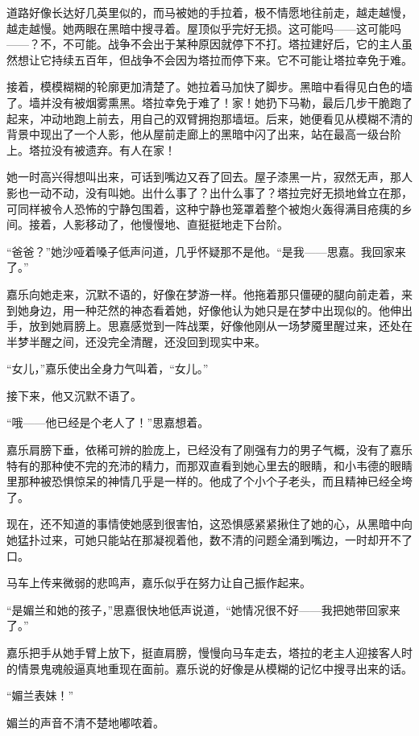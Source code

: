\par 道路好像长达好几英里似的，而马被她的手拉着，极不情愿地往前走，越走越慢，越走越慢。她两眼在黑暗中搜寻着。屋顶似乎完好无损。这可能吗——这可能吗——？不，不可能。战争不会出于某种原因就停下不打。塔拉建好后，它的主人虽然想让它持续五百年，但战争不会因为塔拉而停下来。它不可能让塔拉幸免于难。
\par 接着，模模糊糊的轮廓更加清楚了。她拉着马加快了脚步。黑暗中看得见白色的墙了。墙并没有被烟雾熏黑。塔拉幸免于难了！家！她扔下马勒，最后几步干脆跑了起来，冲动地跑上前去，用自己的双臂拥抱那墙垣。后来，她便看见从模糊不清的背景中现出了一个人影，他从屋前走廊上的黑暗中闪了出来，站在最高一级台阶上。塔拉没有被遗弃。有人在家！
\par 她一时高兴得想叫出来，可话到嘴边又吞了回去。屋子漆黑一片，寂然无声，那人影也一动不动，没有叫她。出什么事了？出什么事了？塔拉完好无损地耸立在那，可同样被令人恐怖的宁静包围着，这种宁静也笼罩着整个被炮火轰得满目疮痍的乡间。接着，人影移动了，他慢慢地、直挺挺地走下台阶。
\par “爸爸？”她沙哑着嗓子低声问道，几乎怀疑那不是他。“是我——思嘉。我回家来了。”
\par 嘉乐向她走来，沉默不语的，好像在梦游一样。他拖着那只僵硬的腿向前走着，来到她身边，用一种茫然的神态看着她，好像他认为她只是在梦中出现似的。他伸出手，放到她肩膀上。思嘉感觉到一阵战栗，好像他刚从一场梦魇里醒过来，还处在半梦半醒之间，还没完全清醒，还没回到现实中来。
\par “女儿，”嘉乐使出全身力气叫着，“女儿。”
\par 接下来，他又沉默不语了。
\par “哦——他已经是个老人了！”思嘉想着。
\par 嘉乐肩膀下垂，依稀可辨的脸庞上，已经没有了刚强有力的男子气概，没有了嘉乐特有的那种使不完的充沛的精力，而那双直看到她心里去的眼睛，和小韦德的眼睛里那种被恐惧惊呆的神情几乎是一样的。他成了个小个子老头，而且精神已经全垮了。
\par 现在，还不知道的事情使她感到很害怕，这恐惧感紧紧揪住了她的心，从黑暗中向她猛扑过来，可她只能站在那凝视着他，数不清的问题全涌到嘴边，一时却开不了口。
\par 马车上传来微弱的悲鸣声，嘉乐似乎在努力让自己振作起来。
\par “是媚兰和她的孩子，”思嘉很快地低声说道，“她情况很不好——我把她带回家来了。”
\par 嘉乐把手从她手臂上放下，挺直肩膀，慢慢向马车走去，塔拉的老主人迎接客人时的情景鬼魂般逼真地重现在面前。嘉乐说的好像是从模糊的记忆中搜寻出来的话。
\par “媚兰表妹！”
\par 媚兰的声音不清不楚地嘟哝着。
